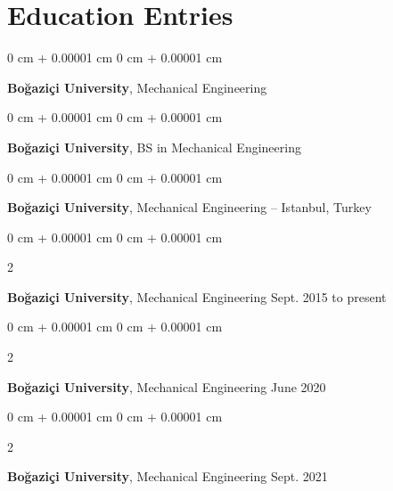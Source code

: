 \documentclass[10pt, letterpaper]{article}
\newenvironment{onecolentry}{
    \begin{adjustwidth}{
        0 cm + 0.00001 cm
    }{
        0 cm + 0.00001 cm
    }
}{
    \end{adjustwidth}
} %
\newenvironment{twocolentry}[2][]{
    \onecolentry
    \def\secondColumn{#2}
    \setcolumnwidth{\fill, 4.5 cm}
    \begin{paracol}{2}
}{
    \switchcolumn \raggedleft \secondColumn
    \end{paracol}
    \endonecolentry
} %
\begin{document}
    
    \section{Education Entries}

        
        \begin{onecolentry}
            \textbf{Boğaziçi University}, Mechanical Engineering\end{onecolentry}



        \vspace{0.2 cm}

        \begin{onecolentry}
            \textbf{Boğaziçi University}, BS in Mechanical Engineering\end{onecolentry}



        \vspace{0.2 cm}

        \begin{onecolentry}
            \textbf{Boğaziçi University}, Mechanical Engineering -- Istanbul, Turkey\end{onecolentry}



        \vspace{0.2 cm}

        \begin{twocolentry}{
            Sept. 2015 to present
        }
            \textbf{Boğaziçi University}, Mechanical Engineering\end{twocolentry}



        \vspace{0.2 cm}

        \begin{twocolentry}{
            June 2020
        }
            \textbf{Boğaziçi University}, Mechanical Engineering\end{twocolentry}



        \vspace{0.2 cm}

        \begin{twocolentry}{
            Sept. 2021
        }
            \textbf{Boğaziçi University}, Mechanical Engineering\end{twocolentry}



        \vspace{0.2 cm}
\end{document}
